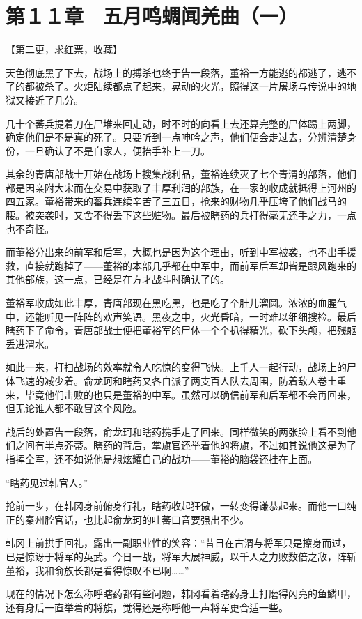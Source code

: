 \section{第１１章　五月鸣蜩闻羌曲（一）}

【第二更，求红票，收藏】

天色彻底黑了下去，战场上的搏杀也终于告一段落，董裕一方能逃的都逃了，逃不了的都被杀了。火炬陆续都点了起来，晃动的火光，照得这一片屠场与传说中的地狱又接近了几分。

几十个蕃兵提着刀在尸堆来回走动，时不时的向看上去还算完整的尸体踢上两脚，确定他们是不是真的死了。只要听到一点呻吟之声，他们便会走过去，分辨清楚身份，一旦确认了不是自家人，便抬手补上一刀。

其余的青唐部战士开始在战场上搜集战利品，董裕连续灭了七个青渭的部落，他们都是因亲附大宋而在交易中获取了丰厚利润的部族，在一家的收成就抵得上河州的四五家。董裕带来的蕃兵连续辛苦了三五日，抢来的财物几乎压垮了他们战马的腰。被突袭时，又舍不得丢下这些赃物。最后被瞎药的兵打得毫无还手之力，一点也不奇怪。

而董裕分出来的前军和后军，大概也是因为这个理由，听到中军被袭，也不出手援救，直接就跑掉了——董裕的本部几乎都在中军中，而前军后军却皆是跟风跑来的其他部族，这一点，已经是在方才战斗时确认了的。

董裕军收成如此丰厚，青唐部现在黑吃黑，也是吃了个肚儿溜圆。浓浓的血腥气中，还能听见一阵阵的欢声笑语。黑夜之中，火光昏暗，一时难以细细搜检。最后瞎药下了命令，青唐部战士便把董裕军的尸体一个个扒得精光，砍下头颅，把残躯丢进渭水。

如此一来，打扫战场的效率就令人吃惊的变得飞快。上千人一起行动，战场上的尸体飞速的减少着。俞龙珂和瞎药又各自派了两支百人队去周围，防着敌人卷土重来，毕竟他们击败的也只是董裕的中军。虽然可以确信前军和后军都不会再回来，但无论谁人都不敢冒这个风险。

战后的处置告一段落，俞龙珂和瞎药携手走了回来。同样微笑的两张脸上看不到他们之间有半点芥蒂。瞎药的背后，掌旗官还举着他的将旗，不过如其说他这是为了指挥全军，还不如说他是想炫耀自己的战功——董裕的脑袋还挂在上面。

“瞎药见过韩官人。”

抢前一步，在韩冈身前俯身行礼，瞎药收起狂傲，一转变得谦恭起来。而他一口纯正的秦州腔官话，也比起俞龙珂的吐蕃口音要强出不少。

韩冈上前拱手回礼，露出一副职业性的笑容：“昔日在古渭与将军只是擦身而过，已是惊讶于将军的英武。今日一战，将军大展神威，以千人之力败数倍之敌，阵斩董裕，我和俞族长都是看得惊叹不已啊……”

现在的情况下怎么称呼瞎药都有些问题，韩冈看着瞎药身上打磨得闪亮的鱼鳞甲，还有身后一直举着的将旗，觉得还是称呼他一声将军更合适一些。

